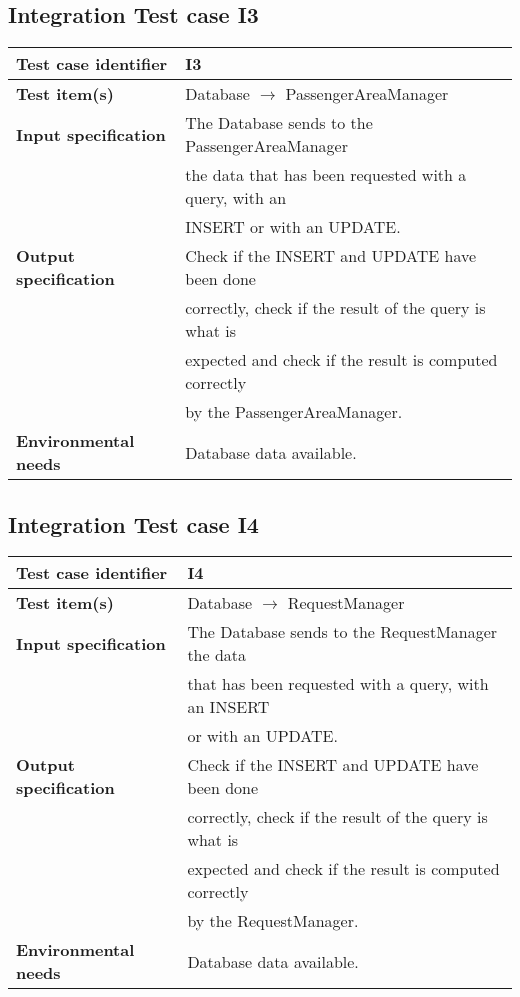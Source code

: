 	\subsection{Integration Test case I3}
		\begin{adjustbox}{max width=\textwidth}
			\begin{tabular}{ l l}
				\hline 		\textbf{Test case identifier} & I3 \\
				\hline		\textbf{Test item(s)}  & Database $\rightarrow$ PassengerAreaManager \\
				\hline		\textbf{Input specification}  & The Database sends to the PassengerAreaManager \\ & the data  that has been requested with a query, with an\\ &  INSERT or with an UPDATE. \\
				\hline		\textbf{Output specification} & Check if the INSERT and UPDATE have been done\\ & correctly, check if the result of the query is what is\\ &  expected and check if the result is computed correctly\\ & by the PassengerAreaManager.\\
				\hline		\textbf{Environmental needs} &  Database data available.\\
				\hline
			\end{tabular}
		\end{adjustbox}
	
	\hypertarget{chapter 3.4}{ }
	\subsection{Integration Test case I4}
		\begin{adjustbox}{max width=\textwidth}
			\begin{tabular}{ l l}
				\hline 		\textbf{Test case identifier} & I4 \\
				\hline		\textbf{Test item(s)}  & Database $\rightarrow$ RequestManager \\
				\hline		\textbf{Input specification}  & The Database sends to the RequestManager the data\\ & that has been requested with a query, with an INSERT\\ & or with an UPDATE. \\
				\hline		\textbf{Output specification} & Check if the INSERT and UPDATE have been done\\ & correctly, check if the result of the query is what is\\ &  expected and check if the result is computed correctly\\ & by the RequestManager.\\
				\hline		\textbf{Environmental needs} & Database data available.\\
				\hline
			\end{tabular}
		\end{adjustbox}
	
